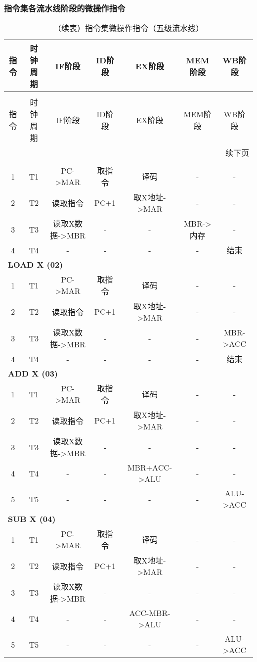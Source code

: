 \documentclass[lang=cn,a4paper,newtx]{elegantpaper}
\begin{document}
\subsubsection{指令集各流水线阶段的微操作指令}
\begin{longtable}{c c c c c c c}
  \caption{指令微操作与控制信号（五级流水线）} \label{tab:CPU:PipelineMicroOps} \\
  \toprule
  指令 & 时钟周期 & IF阶段 & ID阶段 & EX阶段 & MEM阶段 & WB阶段 \\
  \midrule
  \endfirsthead

  \caption[]{（续表）指令集微操作指令（五级流水线）} \\
  \toprule
  指令 & 时钟周期 & IF阶段 & ID阶段 & EX阶段 & MEM阶段 & WB阶段 \\
  \midrule
  \endhead

  \midrule
  \multicolumn{7}{r}{续下页} \\
  \midrule
  \endfoot

  \bottomrule
  \endlastfoot

  \multicolumn{7}{l}{\textbf{STORE X (01)}} \\
  1 & T1 & PC->MAR & 取指令 & 译码 & - & - \\
  2 & T2 & 读取指令 & PC+1 & 取X地址->MAR & - & - \\
  3 & T3 & 读取X数据->MBR & - & - & MBR->内存 & - \\
  4 & T4 & - & - & - & - & 结束 \\

  \multicolumn{7}{l}{\textbf{LOAD X (02)}} \\
  1 & T1 & PC->MAR & 取指令 & 译码 & - & - \\
  2 & T2 & 读取指令 & PC+1 & 取X地址->MAR & - & - \\
  3 & T3 & 读取X数据->MBR & - & - & - & MBR->ACC \\
  4 & T4 & - & - & - & - & 结束 \\

  \multicolumn{7}{l}{\textbf{ADD X (03)}} \\
  1 & T1 & PC->MAR & 取指令 & 译码 & - & - \\
  2 & T2 & 读取指令 & PC+1 & 取X地址->MAR & - & - \\
  3 & T3 & 读取X数据->MBR & - & - & - & - \\
  4 & T4 & - & - & MBR+ACC->ALU & - & - \\
  5 & T5 & - & - & - & - & ALU->ACC \\

  \multicolumn{7}{l}{\textbf{SUB X (04)}} \\
  1 & T1 & PC->MAR & 取指令 & 译码 & - & - \\
  2 & T2 & 读取指令 & PC+1 & 取X地址->MAR & - & - \\
  3 & T3 & 读取X数据->MBR & - & - & - & - \\
  4 & T4 & - & - & ACC-MBR->ALU & - & - \\
  5 & T5 & - & - & - & - & ALU->ACC \\


\end{longtable}
\end{document}
